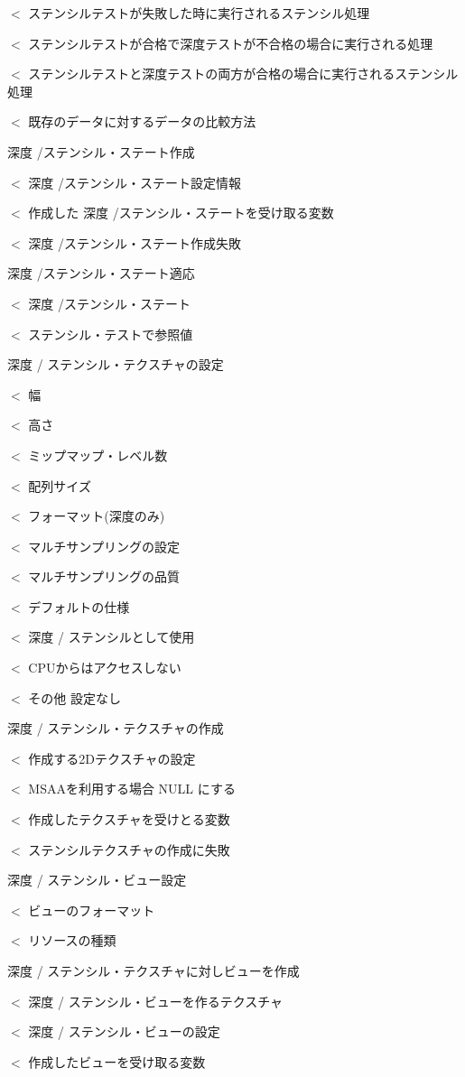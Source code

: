 $<$ ステンシルテストが失敗した時に実行されるステンシル処理

$<$ ステンシルテストが合格で深度テストが不合格の場合に実行される処理

$<$ ステンシルテストと深度テストの両方が合格の場合に実行されるステンシル処理

$<$ 既存のデータに対するデータの比較方法

深度 /ステンシル・ステート作成

$<$ 深度 /ステンシル・ステート設定情報

$<$ 作成した 深度 /ステンシル・ステートを受け取る変数

$<$ 深度 /ステンシル・ステート作成失敗

深度 /ステンシル・ステート適応

$<$ 深度 /ステンシル・ステート

$<$ ステンシル・テストで参照値

深度 / ステンシル・テクスチャの設定

$<$ 幅

$<$ 高さ

$<$ ミップマップ・レベル数

$<$ 配列サイズ

$<$ フォーマット(深度のみ)

$<$ マルチサンプリングの設定

$<$ マルチサンプリングの品質

$<$ デフォルトの仕様

$<$ 深度 / ステンシルとして使用

$<$ C\+P\+Uからはアクセスしない

$<$ その他 設定なし

深度 / ステンシル・テクスチャの作成

$<$ 作成する2\+Dテクスチャの設定

$<$ M\+S\+A\+Aを利用する場合 N\+U\+LL にする

$<$ 作成したテクスチャを受けとる変数

$<$ ステンシルテクスチャの作成に失敗

深度 / ステンシル・ビュー設定

$<$ ビューのフォーマット

$<$ リソースの種類

深度 / ステンシル・テクスチャに対しビューを作成

$<$ 深度 / ステンシル・ビューを作るテクスチャ

$<$ 深度 / ステンシル・ビューの設定

$<$ 作成したビューを受け取る変数

